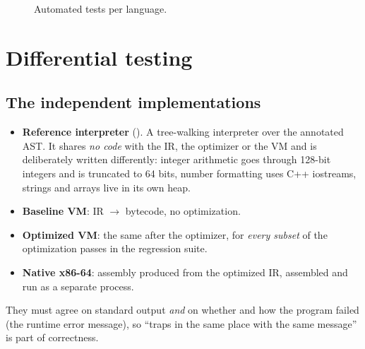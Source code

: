 \begin{figure}[H]\centering
{}
\caption{Automated tests per language.}
\end{figure}

\section{Differential testing}
\subsection{The independent implementations}
\begin{itemize}
  \item \textbf{Reference interpreter} (). A tree-walking interpreter over the annotated AST. It shares \emph{no code} with the IR, the optimizer or the VM and is deliberately written differently: integer arithmetic goes through 128-bit integers and is truncated to 64 bits, number formatting uses C++ iostreams, strings and arrays live in its own heap.
  \item \textbf{Baseline VM}: IR $\to$ bytecode, no optimization.
  \item \textbf{Optimized VM}: the same after the optimizer, for \emph{every subset} of the optimization passes in the regression suite.
  \item \textbf{Native x86-64}: assembly produced from the optimized IR, assembled and run as a separate process.
\end{itemize}
They must agree on standard output \emph{and} on whether and how the program failed (the runtime error message), so ``traps in the same place with the same message'' is part of correctness.


